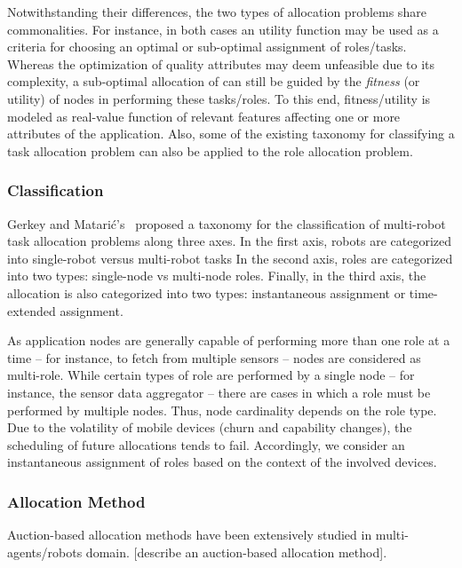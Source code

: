 Notwithstanding their differences, the two types of allocation problems share commonalities. For instance, in both cases an utility function may be used as a criteria for choosing an optimal or sub-optimal assignment of roles/tasks. Whereas the optimization of quality attributes may deem unfeasible due to its complexity, a sub-optimal allocation of can still be guided by the \textit{fitness} (or utility) of nodes in performing these tasks/roles. To this end, fitness/utility is modeled as real-value function of relevant features affecting one or more attributes of the application. Also, some of the existing taxonomy for classifying a task allocation problem can also be applied to the role allocation problem. 


\subsubsection{\textbf{Classification}} Gerkey and Matarić’s~\cite{} proposed a taxonomy for the classification of multi-robot task allocation problems along three axes. In the first axis, robots are categorized into single-robot versus multi-robot tasks%
In the second axis, roles are categorized into two types: single-node vs multi-node roles. Finally, in the third axis, the allocation is also categorized into two types: instantaneous assignment or time-extended assignment.

As application nodes are generally capable of performing more than one role at a time -- for instance, to fetch from multiple sensors -- nodes are considered as multi-role. While certain types of role are performed by a single node -- for instance, the sensor data aggregator -- there are cases in which a role must be performed by multiple nodes. Thus, node cardinality depends on the role type. Due to the volatility of mobile devices (churn and capability changes), the scheduling of future allocations tends to fail. Accordingly, we consider an instantaneous assignment of roles based on the context of the involved devices.

\subsubsection{\textbf{Allocation Method}} Auction-based allocation methods have been extensively studied in multi-agents/robots domain. [describe an auction-based allocation method].

